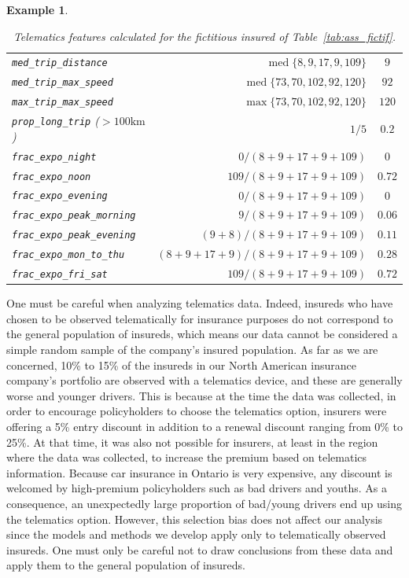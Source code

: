 \documentclass{article}
\DeclareMathOperator*{\mediane}{med}
\newtheorem{Example}{Example}
\begin{document}
\begin{Example}
\begin{table}[ht]
\begin{adjustbox}{width = 0.8\textwidth}
\begin{tabular}{l r c}
                \texttt{med\_trip\_distance} & $\mediane\{8, 9, 17, 9, 109\}$ & $9$\\
                \texttt{med\_trip\_max\_speed} & $\mediane\{73, 70, 102, 92, 120\}$ & $92$\\ 
                \texttt{max\_trip\_max\_speed} & $\max\{73, 70, 102, 92, 120\}$ & $120$\\ 
                \texttt{prop\_long\_trip} ($>100\text{km}$) & $1/5$ & $0.2$\\ 
                \texttt{frac\_expo\_night} & $0/(8 + 9 + 17 + 9 + 109)$ & $0$\\ 
                \texttt{frac\_expo\_noon} & $109/(8 + 9 + 17 + 9 + 109)$ & $0.72$\\ 
                \texttt{frac\_expo\_evening} & $0/(8 + 9 + 17 + 9 + 109)$ & $0$\\ 
                \texttt{frac\_expo\_peak\_morning} & $9/(8 + 9 + 17 + 9 + 109)$ & $0.06$\\
                \texttt{frac\_expo\_peak\_evening} & $(9 + 8)/(8 + 9 + 17 + 9 + 109)$ & $0.11$\\ 
                \texttt{frac\_expo\_mon\_to\_thu} & $(8 + 9 + 17 + 9)/(8 + 9 + 17 + 9 + 109)$ & $0.28$\\
                \texttt{frac\_expo\_fri\_sat} & $109/(8 + 9 + 17 + 9 + 109)$ & $0.72$\\
                \bottomrule 
            \end{tabular}
        \end{adjustbox}
        \caption{Telematics features calculated for the fictitious insured of Table~\ref{tab:ass_fictif}.} 
        \label{tab:14} 
    \end{table}
\end{Example}

One must be careful when analyzing telematics data. Indeed, insureds who have chosen to be observed telematically for insurance purposes do not correspond to the general population of insureds, which means our data cannot be considered a simple random sample of the company's insured population. As far as we are concerned, 10\% to 15\% of the insureds in our North American insurance company's portfolio are observed with a telematics device, and these are generally worse and younger drivers. This is because at the time the data was collected, in order to encourage policyholders to choose the telematics option, insurers were offering a 5\% entry discount in addition to a renewal discount ranging from 0\% to 25\%. At that time, it was also not possible for insurers, at least in the region where the data was collected, to increase the premium based on telematics information. Because car insurance in Ontario is very expensive, any discount is welcomed by high-premium policyholders such as bad drivers and youths. As a consequence, an unexpectedly large proportion of bad/young drivers end up using the telematics option. However, this selection bias does not affect our analysis since the models and methods we develop apply only to telematically observed insureds. One must only be careful not to draw conclusions from these data and apply them to the general population of insureds.
\end{document}
